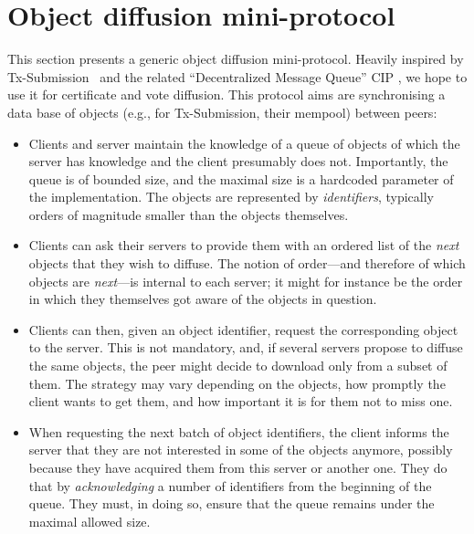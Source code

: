 \section{Object diffusion mini-protocol}%
\label{sec:object-diffusion-protocol}

This section presents a generic object diffusion mini-protocol. Heavily inspired
by Tx-Submission~\cite[Section~3.9]{network-spec-150} and the related
\enquote{Decentralized Message Queue} CIP \parencite{dmq-cip}, we hope to use it
for certificate and vote diffusion. This protocol aims are synchronising a data
base of objects (e.g., for Tx-Submission, their mempool) between peers:
%
\begin{itemize}
\item
  Clients and server maintain the knowledge of a queue of objects of which the server has knowledge and the client presumably does not.
  Importantly, the queue is of bounded size, and the maximal size is a hardcoded parameter of the
  implementation.
  The objects are represented by {\em identifiers}, typically orders of magnitude smaller than the objects themselves.

\item
  Clients can ask their servers to provide them with an ordered list of the {\em next} objects that they wish to diffuse.
  The notion of order---and therefore of which objects are {\em next}---is internal to each server; it might for instance be the order in which they themselves got aware of the objects in question.

\item
  Clients can then, given an object identifier, request the corresponding object to the server.
  This is not mandatory, and, if several servers propose to diffuse the same objects, the peer might decide to download only from a subset of them.
  The strategy may vary depending on the objects, how promptly the client wants to get them, and how important it is for them not to miss one.

\item
  When requesting the next batch of object identifiers, the client informs the server that they are not interested in some of the objects anymore, possibly because they have acquired them from this server or another one.
  They do that by {\em acknowledging} a number of identifiers from the beginning of the queue.
  They must, in doing so, ensure that the queue remains under the maximal allowed size.
\end{itemize}

